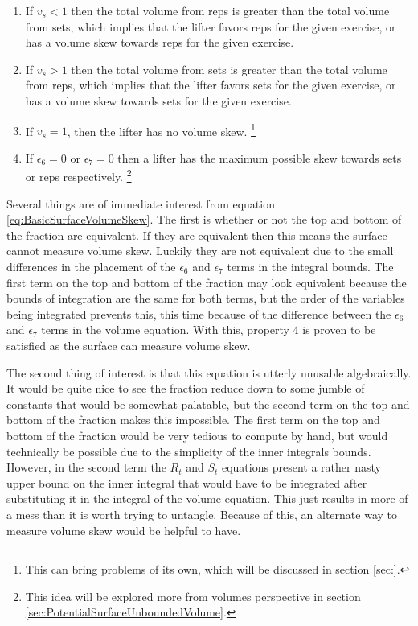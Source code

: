 \begin{enumerate}
    \item If $v_s<1$ then the total volume from reps is greater than the total volume from sets, which implies that the lifter favors reps for the given exercise, or has a volume skew towards reps for the given exercise.
    \item If $v_s>1$ then the total volume from sets is greater than the total volume from reps, which implies that the lifter favors sets for the given exercise, or has a volume skew towards sets for the given exercise.
    \item If $v_s=1$, then the lifter has no volume skew. \footnote{This can bring problems of its own, which will be discussed in section \ref{sec:}.}
    \item If $\epsilon_6=0$ or $\epsilon_7=0$ then a lifter has the maximum possible skew towards sets or reps respectively. \footnote{This idea will be explored more from volumes perspective in section \ref{sec:PotentialSurfaceUnboundedVolume}.}
\end{enumerate}

Several things are of immediate interest from equation \ref{eq:BasicSurfaceVolumeSkew}. The first is whether or not the top and bottom of the fraction are equivalent. If they are equivalent then this means the surface cannot measure volume skew. Luckily they are not equivalent due to the small differences in the placement of the $\epsilon_6$ and $\epsilon_7$ terms in the integral bounds. The first term on the top and bottom of the fraction may look equivalent because the bounds of integration are the same for both terms, but the order of the variables being integrated prevents this, this time because of the difference between the $\epsilon_6$ and $\epsilon_7$ terms in the volume equation. With this, property 4 is proven to be satisfied as the surface can measure volume skew.

The second thing of interest is that this equation is utterly unusable algebraically. It would be quite nice to see the fraction reduce down to some jumble of constants that would be somewhat palatable, but the second term on the top and bottom of the fraction makes this impossible. The first term on the top and bottom of the fraction would be very tedious to compute by hand, but would technically be possible due to the simplicity of the inner integrals bounds. However, in the second term the $R_t$ and $S_t$ equations present a rather nasty upper bound on the inner integral that would have to be integrated after substituting it in the integral of the volume equation. This just results in more of a mess than it is worth trying to untangle. Because of this, an alternate way to measure volume skew would be helpful to have.

